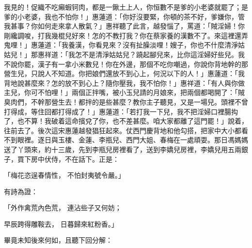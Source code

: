 我見的！促織不吃癩蝦钶肉，都是一鍬土上人，你恒數不是爹的小老婆就罷了；是爹的小老婆，我也不怕你！」惠蓮道：「你好沒要緊，你頓的茶不好，爹嫌你，管我甚事？你如何走來拿人散氣？」惠祥聽了此言，越發惱了，罵道：「賊淫婦！你剛纔調唆，打我幾棍兒好來！怎的不教打我？你在蔡家養的漢數不了。來這裡還弄鬼哩！」惠蓮道：「我養漢，你看見來？沒有扯臊淡哩！嫂子，你也不什麼清淨姑姑兒！」那惠祥道：「我怎不是清淨姑姑兒？蹺起腳兒來，比你這淫婦好些兒。我不說你罷，漢子有一拿小米數兒！你在外邊，那個不吃你嘲過，你說你背地幹的那營生兒，只說人不知道。你把娘們還放不到心上，何況以下的人！」惠蓮道：「我背地說甚麼來？怎的放不到心上？隨你壓我，我不怕你！」惠祥道：「有人與你做主兒，你可不怕哩！」兩個正拌嘴，被小玉兒請的月娘來，把兩個都喝開了：「賊臭肉們，不幹那營生去！都拌的是些甚麼？教你主子聽見，又是一場兒。頭裡不曾打得成，等住回都打得成了！」惠蓮道：「若打我一下兒，我不把淫婦口裡腸抅了，也不算！我破着這命擯兌了你，也不差甚麼。咱大家都離了這門罷！」說着，往前去了。後次這宋惠蓮越發猖狂起來。仗西門慶背地和他勾搭，把家中大小都看不到眼裡。逐日與玉樓、金蓮、李瓶兒、西門大姐、春梅在一處頑耍。那日馮媽媽送了丫頭來，約十三歲，先到李瓶兒房裡看了，送到李嬌兒房裡，李嬌兒用五兩銀子，買下房中伏侍，不在話下。正是：

「梅花恣逞春情性，  不怕封夷號令嚴。」

有詩為證：

「外作禽荒內色荒，  連沾些子又何妨；

早辰跨得雕鞍去，  日暮歸來紅粉香。」

畢竟未知後來何如，且聽下回分解：

